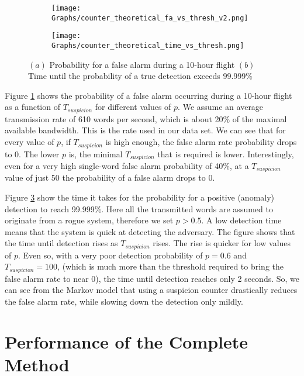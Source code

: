 \documentclass[english]{llncs}
\newcommand{\level}[1]{\section{#1}}
\newcommand{\level}[1]{\chapter{#1}}
\begin{document}
   \begin{figure}[t]
     \centering
    \begin{subfigure}{0.5\linewidth}
      \centering
      \texttt{[image: Graphs/counter\_theoretical\_fa\_vs\_thresh\_v2.png]}
      \caption{}
      \label{fig:CounterTheoreticalFA}
    \end{subfigure}%
    \begin{subfigure}{0.5\linewidth}
      \centering
      \texttt{[image: Graphs/counter\_theoretical\_time\_vs\_thresh.png]}
      \caption{}
      \label{fig:CounterTheoreticalTime}
    \end{subfigure}
    \caption{\((a)\) Probability for a false alarm during a 10-hour flight \((b)\) Time until the probability of a true detection exceeds 99.999\%}
  \end{figure}

  Figure \ref{fig:CounterTheoreticalFA} shows the probability of a false alarm occurring during a 10-hour flight as a function of $T_{suspicion}$ for different values of $p$. We assume an average transmission rate of 610 words per second, which is about 20\% of the maximal available bandwidth. This is the rate used in our data set. We can see that for every value of $p$, if $T_{suspicion}$ is high enough, the false alarm rate probability drops to 0. The lower $p$ is, the minimal $T_{suspicion}$ that is required is lower. Interestingly, even for a very high single-word false alarm probability of 40\%, at a $T_{suspicion}$ value of just 50 the probability of a false alarm drops to 0.
   
  Figure \ref{fig:CounterTheoreticalTime} show the time it takes for the probability for a positive (anomaly) detection to reach 99.999\%. Here all the transmitted words are assumed to originate from a rogue system, therefore we set $p > 0.5$. A low detection time means that the system is quick at detecting the adversary. The figure shows that the time until detection rises as $T_{suspicion}$ rises. The rise is quicker for low values of $p$. Even so, with a very poor detection probability of $p = 0.6$ and $T_{suspicion} = 100$, (which is much more than the threshold required to bring the false alarm rate to near 0), the time until detection reaches only 2 seconds. So, we can see from the Markov model that using a suspicion counter drastically reduces the false alarm rate, while slowing down the detection only mildly.

\vspace*{-1ex}  
\level{Performance of the Complete Method} \label{PerformanceEvaluationCompleteMethod}
\end{document}
